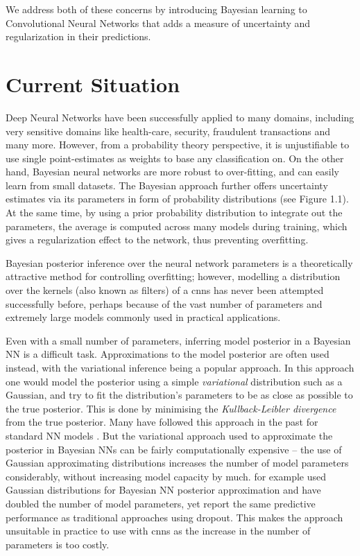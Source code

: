 We address both of these concerns by introducing Bayesian learning to Convolutional Neural Networks that adds a measure of uncertainty and regularization in their predictions. 

\section{Current Situation}

Deep Neural Networks have been successfully applied to many domains, including very sensitive domains like health-care, security, fraudulent transactions and many more. However, from a probability theory perspective, it is unjustifiable to use single point-estimates as weights to base any classification on.
On the other hand, Bayesian neural networks are more robust to over-fitting, and can easily learn from small datasets. The Bayesian approach further offers uncertainty estimates via its parameters in form of probability distributions (see Figure 1.1). At the same time, by using a prior probability distribution to integrate out the parameters, the average is computed across many models during training, which gives a regularization effect to the network, thus preventing overfitting.

Bayesian posterior inference over the neural network parameters is a theoretically attractive method for controlling overfitting; however, modelling a distribution over the kernels (also known as filters) of a \acp{cnn} has never been attempted successfully before, perhaps because of the vast number of parameters and extremely large models commonly used in practical applications.

Even with a small number of parameters, inferring model posterior in a Bayesian NN is a difficult task. Approximations to the model posterior are often used instead, with the variational inference being a popular approach. In this approach one would model the posterior using a simple \textit{variational} distribution such as a Gaussian, and try to fit the distribution's parameters to be as close as possible to the true posterior. This is done by minimising the \textit{Kullback-Leibler divergence} from the true posterior. Many have followed this approach in the past for standard NN models \citep{hinton1993keeping,barber1998ensemble,graves2011practical,blundell2015weight}.
But the variational approach used to approximate the posterior in Bayesian NNs can be fairly computationally expensive -- the use of Gaussian approximating distributions increases the number of model parameters considerably, without increasing model capacity by much. \citet{blundell2015weight} for example used Gaussian distributions for Bayesian NN posterior approximation and have doubled the number of model parameters, yet report the same predictive performance as traditional approaches using dropout. This makes the approach unsuitable in practice to use with \acp{cnn} as the increase in the number of parameters is too costly.

